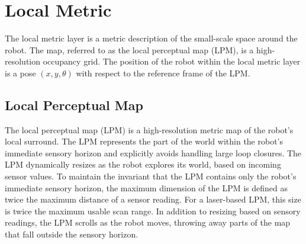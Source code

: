 \documentclass{article}
\begin{document}
% 
% 
% 

\section{Local Metric}
The local metric layer is a metric description of the small-scale space around the robot. The map, referred to as the
local perceptual map (LPM), is a high-resolution occupancy grid. The position of the robot within the local metric
layer is a pose $(x,y,\theta)$ with respect to the reference frame of the LPM.

\subsection{Local Perceptual Map}
The local perceptual map (LPM) is a high-resolution metric map of the robot's local surround. The LPM represents the
part of the world within the robot's immediate sensory horizon and explicitly avoids handling large loop closures. The
LPM dynamically resizes as the robot explores its world, based on incoming sensor values. To maintain the invariant that
the LPM contains only the robot's immediate sensory horizon, the maximum dimension of the LPM is defined as twice the
maximum distance of a sensor reading. For a laser-based LPM, this size is twice the maximum usable scan range. In
addition to resizing based on sensory readings, the LPM scrolls as the robot moves, throwing away parts of the map that
fall outside the sensory horizon.
\end{document}
